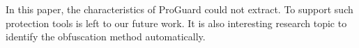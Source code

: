 \documentclass[conference]{IEEEtran}
\begin{document}
In this paper, the characteristics of ProGuard could not extract.  To
support such protection tools is left to our future work.  It is also
interesting research topic to identify the obfuscation method
automatically.






\end{document}
